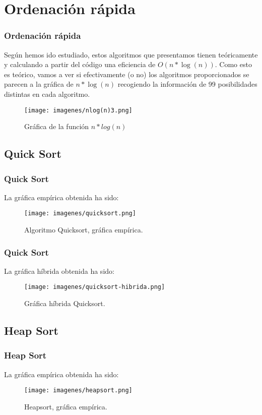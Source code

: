 \documentclass{beamer}
\begin{document}
\section{Ordenación rápida} %
\begin{frame}
	\frametitle{Ordenación rápida}
	Según hemos ido estudiado, estos algoritmos que presentamos tienen teóricamente y calculando a partir del código una eficiencia de $O(n*\log(n) )$. Como esto es teórico, vamos a ver si efectivamente (o no) los algoritmos proporcionados se parecen a la gráfica de $n*\log(n)$ recogiendo la información de 99 posibilidades distintas en cada algoritmo.
	\begin{figure} [H]
		\centering
		\texttt{[image: imagenes/nlog(n)3.png]}
		\caption{Gráfica de la función $n*log(n)$}
		\label{fig:E8}
	\end{figure}
	
\end{frame}
\subsection{Quick Sort}
\begin{frame}
	\frametitle{Quick Sort}
	La gráfica empírica obtenida ha sido:
	\begin{figure}
		\centering
		\texttt{[image: imagenes/quicksort.png]}
		\caption{Algoritmo Quicksort, gráfica empírica. }
		\label{fig:E9}
	\end{figure}
	
\end{frame}

\begin{frame}
	\frametitle{Quick Sort}
	La gráfica híbrida obtenida ha sido:
	\begin{figure}
		\centering
		\texttt{[image: imagenes/quicksort-hibrida.png]}
		\caption{Gráfica híbrida Quicksort.}
		\label{fig:E10}
	\end{figure}
\end{frame}
\subsection{Heap Sort}
\begin{frame}
	\frametitle{Heap Sort}
	La gráfica empírica obtenida ha sido:
	\begin{figure}
		\centering
		\texttt{[image: imagenes/heapsort.png]}
		\caption{Heapsort, gráfica empírica.}
		\label{fig:E11}
	\end{figure}
	
\end{frame}
\end{document}
